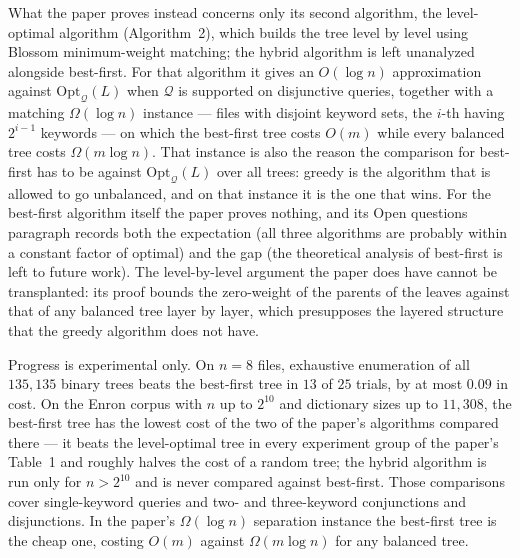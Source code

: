 \documentclass{conjura-conjecture}
\newcommand{\Qd}{\mathcal{Q}}
\newcommand{\Opt}{\mathrm{Opt}}
\begin{document}
What the paper proves instead concerns only its second algorithm, the
level-optimal algorithm (Algorithm~2), which builds the tree level by
level using Blossom minimum-weight matching; the hybrid algorithm is left
unanalyzed alongside best-first. For that algorithm it gives an
$O(\log n)$ approximation against $\Opt_{\Qd}(L)$ when $\Qd$ is supported
on disjunctive queries, together with a matching $\Omega(\log n)$
instance --- files with disjoint keyword sets, the $i$-th having
$2^{i-1}$ keywords --- on which the best-first tree costs $O(m)$ while
every balanced tree costs $\Omega(m\log n)$. That instance is also the
reason the comparison for best-first has to be against $\Opt_{\Qd}(L)$
over all trees: greedy is the algorithm that is allowed to go unbalanced,
and on that instance it is the one that wins. For the best-first
algorithm itself the paper proves nothing, and its Open questions
paragraph records both the expectation (all three algorithms are probably
within a constant factor of optimal) and the gap (the theoretical
analysis of best-first is left to future work). The level-by-level
argument the paper does have cannot be transplanted: its proof bounds the
zero-weight of the parents of the leaves against that of any balanced
tree layer by layer, which presupposes the layered structure that the
greedy algorithm does not have.

Progress is experimental only. On $n=8$ files, exhaustive enumeration of
all $135{,}135$ binary trees beats the best-first tree in $13$ of $25$
trials, by at most $0.09$ in cost. On the Enron corpus with $n$ up to
$2^{10}$ and dictionary sizes up to $11{,}308$, the best-first tree has
the lowest cost of the two of the paper's algorithms compared there ---
it beats the level-optimal tree in every experiment group of the paper's
Table~1 and roughly halves the cost of a random tree; the hybrid
algorithm is run only for $n > 2^{10}$ and is never compared against
best-first. Those comparisons cover single-keyword queries and two- and
three-keyword conjunctions and disjunctions. In the paper's
$\Omega(\log n)$ separation instance the best-first tree is the cheap
one, costing $O(m)$ against $\Omega(m \log n)$ for any balanced tree.
\end{document}
